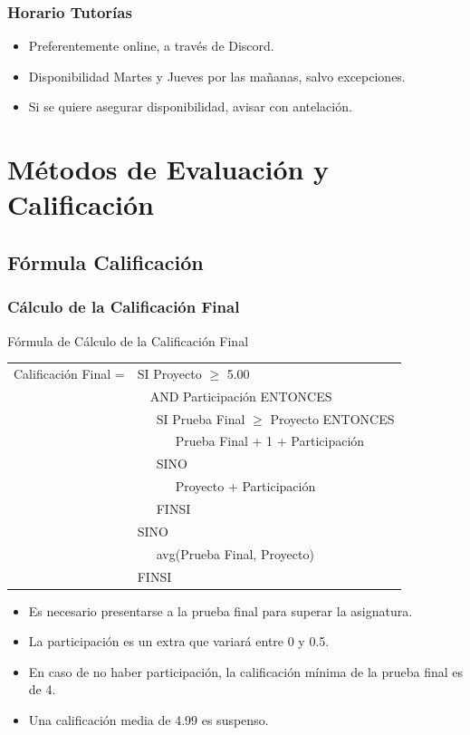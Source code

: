 \documentclass[a4paper,slidestop,xcolor=pst,dvips,blue]{beamer}
\begin{document}
\begin{frame}[c]
	\frametitle{Horario Tutorías}
    \begin{itemize}[<+->]
        \item Preferentemente online, a través de Discord.
        \item Disponibilidad Martes y Jueves por las mañanas, salvo excepciones.
        \item Si se quiere asegurar disponibilidad, avisar con antelación.
	\end{itemize}
\end{frame}

\section{Métodos de Evaluación y Calificación}

\subsection{Fórmula Calificación}

\begin{frame}[c]
	\frametitle{Cálculo de la Calificación Final}
	\begin{block}{Fórmula de Cálculo de la Calificación Final}
		\begin{scriptsize}
        \begin{tabular}{ll}
			Calificación Final = & SI Proyecto $\geq$ 5.00 \\
                                 & \ \ AND Participación ENTONCES \\
                                 & \ \ \ SI Prueba Final  $\geq$ Proyecto ENTONCES \\
                                 & \ \ \ \ \ \ Prueba Final + 1 + Participación \\
                                 & \ \ \ SINO \\
                                 & \ \ \ \ \ \ Proyecto + Participación \\
                                 & \ \ \ FINSI \\
                                 & SINO \\
                                 & \ \ \ avg(Prueba Final, Proyecto)  \\
                                 & FINSI \\
		\end{tabular}
        \end{scriptsize}
	\end{block}
	\begin{itemize}
		\item<2-> Es necesario presentarse a la prueba final para superar la asignatura.
        \item<3-> La participación es un extra que variará entre 0 y 0.5.
        \item<4-> En caso de no haber participación, la calificación mínima de la prueba final es de 4.
        \item<5-> Una calificación media de 4.99 es suspenso.
	\end{itemize}
\end{frame}
\end{document}
